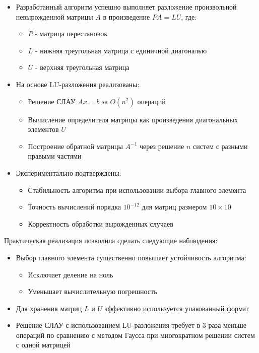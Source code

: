 \begin{itemize}
\item Разработанный алгоритм успешно выполняет разложение произвольной невырожденной матрицы $A$ в произведение $PA = LU$, где:
\begin{itemize}
\item $P$ - матрица перестановок
\item $L$ - нижняя треугольная матрица с единичной диагональю
\item $U$ - верхняя треугольная матрица
\end{itemize}

\item На основе LU-разложения реализованы:
\begin{itemize}
\item Решение СЛАУ $Ax = b$ за $O(n^2)$ операций
\item Вычисление определителя матрицы как произведения диагональных элементов $U$
\item Построение обратной матрицы $A^{-1}$ через решение $n$ систем с разными правыми частями
\end{itemize}

\item Экспериментально подтверждены:
\begin{itemize}
\item Стабильность алгоритма при использовании выбора главного элемента
\item Точность вычислений порядка $10^{-12}$ для матриц размером $10 \times 10$
\item Корректность обработки вырожденных случаев
\end{itemize}
\end{itemize}

Практическая реализация позволила сделать следующие наблюдения:

\begin{itemize}
\item Выбор главного элемента существенно повышает устойчивость алгоритма:
\begin{itemize}
\item Исключает деление на ноль
\item Уменьшает вычислительную погрешность
\end{itemize}

\item Для хранения матриц $L$ и $U$ эффективно используется упакованный формат

\item Решение СЛАУ с использованием LU-разложения требует в 3 раза меньше операций по сравнению с методом Гаусса при многократном решении систем с одной матрицей
\end{itemize}


